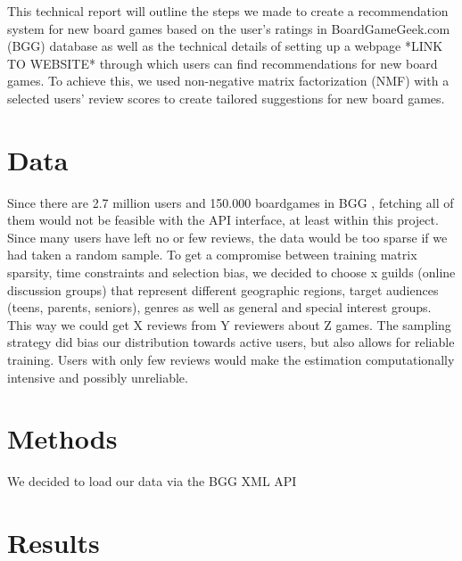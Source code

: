 \documentclass[a4paper,12pt,bibliography=totoc,numbers=noenddot,sfdefaults=false,abstract=true,notitlepage]{scrartcl} %
\begin{document}
	This technical report will outline the steps we made to create a recommendation system for new board games based on the user's ratings in BoardGameGeek.com (BGG) database as well as the technical details of setting up a webpage *LINK TO WEBSITE* through which users can find recommendations for new board games. To achieve this, we used non-negative matrix factorization (NMF) with a selected users' review scores to create tailored suggestions for new board games.
	
	
	
	
	\section{Data}\label{data}


	Since there are 2.7 million users  and 150.000 boardgames in BGG \autocite{didymus-trueBoardGameGeeksSupportDrive2024,wordsratedBoardGamesStatistics2025}, fetching all of them would not be feasible with the API interface, at least within this project. Since many users have left no or few reviews, the data would be too sparse if we had taken a random sample. To get a compromise between training matrix sparsity, time constraints and selection bias, we decided to choose x guilds (online discussion groups) that represent different geographic regions, target audiences (teens, parents, seniors), genres as well as general and special interest groups. This way we could get X reviews from Y reviewers about Z games. The sampling strategy did bias our distribution towards active users, but also allows for reliable training. Users with only few reviews would make the estimation computationally intensive and possibly unreliable.

	\section{Methods}\label{methods}
	
	We decided to load our data via the BGG XML API \autocite{BGGBGGXMLAPI22025}
	
	

	
	
	\section{Results}\label{results}
	
\end{document}
